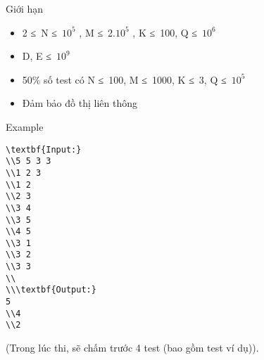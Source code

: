 Giới hạn
\begin{itemize}
	\item     2 ≤ N ≤ $10^{5}$    , M ≤ 2.$10^{5}$    , K ≤ 100, Q ≤ $10^{6}$
	\item     D, E ≤ $10^{9}$
	\item     50\% số test có N ≤ 100, M ≤ 1000, K ≤ 3, Q ≤ $10^{5}$
	\item     Đảm bảo đồ thị liên thông   
\end{itemize}
Example
\begin{verbatim}
\textbf{Input:}
\\5 5 3 3
\\1 2 3
\\1 2
\\2 3
\\3 4
\\3 5
\\4 5
\\3 1
\\3 2
\\3 3
\\
\\\textbf{Output:}
5
\\4
\\2\end{verbatim}

(Trong lúc thi, sẽ chấm trước 4 test (bao gồm test ví dụ)).